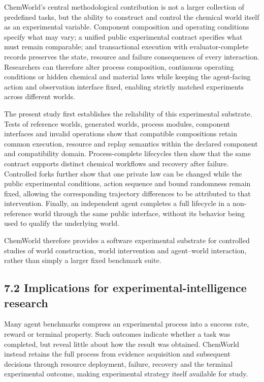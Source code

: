 \documentclass[10pt,twocolumn]{article}
\begin{document}
ChemWorld's central methodological contribution is not a larger
collection of predefined tasks, but the ability to construct and control
the chemical world itself as an experimental variable. Component
composition and operating conditions specify what may vary; a unified
public experimental contract specifies what must remain comparable; and
transactional execution with evaluator-complete records preserves the
state, resource and failure consequences of every interaction.
Researchers can therefore alter process composition, continuous
operating conditions or hidden chemical and material laws while keeping
the agent-facing action and observation interface fixed, enabling
strictly matched experiments across different worlds.

The present study first establishes the reliability of this experimental
substrate. Tests of reference worlds, generated worlds, process modules,
component interfaces and invalid operations show that compatible
compositions retain common execution, resource and replay semantics
within the declared component and compatibility domain. Process-complete
lifecycles then show that the same contract supports distinct chemical
workflows and recovery after failure. Controlled forks further show that
one private law can be changed while the public experimental conditions,
action sequence and bound randomness remain fixed, allowing the
corresponding trajectory differences to be attributed to that
intervention. Finally, an independent agent completes a full lifecycle
in a non-reference world through the same public interface, without its
behavior being used to qualify the underlying world.

ChemWorld therefore provides a software experimental substrate for
controlled studies of world construction, world intervention and
agent--world interaction, rather than simply a larger fixed benchmark
suite.

\subsection{7.2 Implications for experimental-intelligence
research}\label{implications-for-experimental-intelligence-research}

Many agent benchmarks compress an experimental process into a success
rate, reward or terminal property. Such outcomes indicate whether a task
was completed, but reveal little about how the result was obtained.
ChemWorld instead retains the full process from evidence acquisition and
subsequent decisions through resource deployment, failure, recovery and
the terminal experimental outcome, making experimental strategy itself
available for study.
\end{document}
